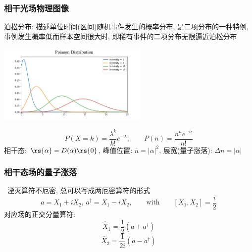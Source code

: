 \begin{frame}
    \frametitle{相干光场物理图像}
    {\Bullet}泊松分布: 描述单位时间(区间)随机事件发生的概率分布, 是二项分布的一种特例, 事例发生概率低而样本空间很大时, 即稀有事件的二项分布无限逼近泊松分布
      \begin{center}
           \includegraphics[width=0.55\textwidth]{figs/2022-04-27-09-17-50.png}
      \end{center}
   \[ P(X=k)=\frac{\lambda^{k}}{k !} e^{-\lambda} ; \qquad P (n) =  \frac{ \overline{n} ^{n} e^{-\overline{n}}}{n!} \]
   相干态: $ \rs{\alpha} =  D(\alpha)  \rs{0} $, 
   峰值位置: $ \overline{n} = \left| \alpha\right|^2 $, 展宽(量子涨落): $ \Delta n = \left| \alpha\right| $ 
\end{frame}

\begin{frame}
 \frametitle{相干态场的量子涨落}
 \例[9.试证明所有的相干态都是最小不确定度乘积态]{
   \[ \Delta X_1 \Delta X_2 =\dfrac{1}{4}, \, \Delta X_1 = \Delta X_2 = \frac{1}{2} \] 
  }
 \解~湮灭算符不厄密, 总可以写成两厄密算符的形式
 \[ a = X_1 + i X_2, \, a ^\dagger = X_1 - i X_2, \qquad \text{with}\qquad  [X_1, X_2]= \frac{i}{2} \]
 对应场的正交分量算符: 
 \[ \hat{X}_{1} =\frac{1}{2}\left(a + a^{\dagger}\right)\]
 \[ \hat{X}_{2} = \frac{1}{2 i}\left(a - a^{\dagger}\right)\]
\end{frame}




